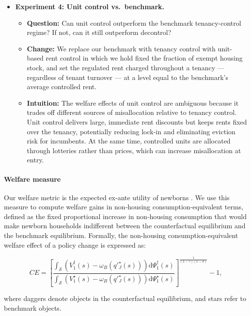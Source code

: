 \documentclass[parskip=full]{article}
\begin{document}
\begin{itemize}
\item \textbf{Experiment 4: Unit control vs.\ benchmark.}
\begin{itemize}
    \item \textbf{Question:} Can unit control outperform the benchmark tenancy-control regime? If not, can it still outperform decontrol?
    \item \textbf{Change:} We replace our benchmark with tenancy control with unit-based rent control in which we hold fixed the fraction of exempt housing stock, and set the regulated rent charged throughout a tenancy — regardless of tenant turnover — at a level equal to the benchmark’s average controlled rent.
    \item \textbf{Intuition:} The welfare effects of unit control are ambiguous because it trades off different sources of misallocation relative to tenancy control. Unit control delivers large, immediate rent discounts but keeps rents fixed over the tenancy, potentially reducing lock-in and eliminating eviction risk for incumbents. At the same time, controlled units are allocated through lotteries rather than prices, which can increase misallocation at entry.
\end{itemize}

\end{itemize}

\paragraph{Welfare measure} Our welfare metric is the expected ex-ante utility of newborns \citep{ralws-1971,conesa-et-al,gkkoc}. We use this measure to compute welfare gains in non‑housing consumption‑equivalent terms, defined as the fixed proportional increase in non‑housing consumption that would make newborn households indifferent between the counterfactual equilibrium and the benchmark equilibrium. Formally, the non-housing consumption-equivalent welfare effect of a policy change is expressed as:

\begin{equation}
  CE = \left[\frac{\int_{\mathcal{S}}\left(V^{\dagger}_{1}(s)-\omega_{B}\left(q'^{\star}_{J}(s)\right)\right)\mathrm{d}\Psi^{\dagger}_{1}(s)}{\int_{\mathcal{S}}\left(V^{\star}_{1}(s)-\omega_{B}\left(q'^{\star}_{J}(s)\right)\right)\mathrm{d}\Psi^{\star}_{1}(s)}\right]^{\frac{1}{(1-\gamma)(1-\sigma)}}-1,
\end{equation}

\noindent where daggers denote objects in the counterfactual equilibrium, and stars refer to benchmark objects. 
\end{document}
